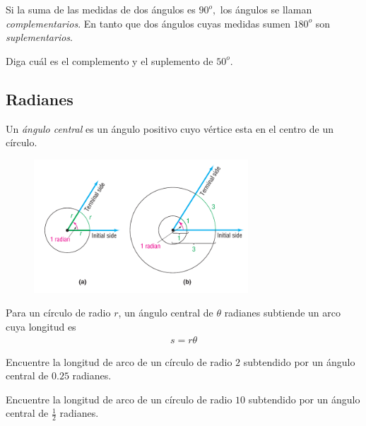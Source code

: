 {}
	Si la suma de las medidas de  dos ángulos es $90^{o},$ los ángulos se llaman \emph{complementarios}. En tanto que dos ángulos cuyas medidas sumen $180^{o}$ son \emph{suplementarios}.

{}
	\begin{problema}
		\label{exmp:1011}
		Diga cuál es el complemento y el suplemento de $50^{o}$.
	\end{problema}
	

\subsection{Radianes}
{}
	Un \emph{ángulo central} es un ángulo positivo cuyo vértice esta en el centro de un círculo. 

{}
	\begin{figure}
		\centering
		\includegraphics[height=5cm,keepaspectratio=true]{./trig/sull0610.png}
		\label{fig:sull6110}
	\end{figure}
	

{}
	\begin{teorema}
		Para un círculo de radio $r$, un ángulo central  de $\theta$ radianes subtiende un arco cuya longitud es 
		\begin{align}
			\label{sull6104}
			s = r\theta
		\end{align}
	\end{teorema}
	

{}
	\begin{problema}
		\label{exmp:sull6103}
		Encuentre la longitud de arco de un círculo de radio $2$ subtendido por un ángulo central de $0.25$ radianes. 
	\end{problema}

{}
	\begin{problema}
		\label{exe:sull6171}
		Encuentre la longitud de arco de un círculo de radio $10$ subtendido por un ángulo central de $\frac{1}{2}$ radianes. 
	\end{problema}
	

